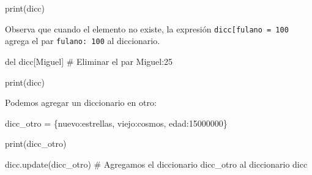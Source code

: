 \documentclass[
  letterpaper,
  DIV=11,
  numbers=noendperiod]{scrreprt}
\newenvironment{Shaded}{\begin{snugshade}}{\end{snugshade}}
\newcommand{\BuiltInTok}[1]{\textcolor[rgb]{0.00,0.23,0.31}{#1}}
\newcommand{\CommentTok}[1]{\textcolor[rgb]{0.37,0.37,0.37}{#1}}
\newcommand{\DecValTok}[1]{\textcolor[rgb]{0.68,0.00,0.00}{#1}}
\newcommand{\KeywordTok}[1]{\textcolor[rgb]{0.00,0.23,0.31}{#1}}
\newcommand{\NormalTok}[1]{\textcolor[rgb]{0.00,0.23,0.31}{#1}}
\newcommand{\OperatorTok}[1]{\textcolor[rgb]{0.37,0.37,0.37}{#1}}
\newcommand{\StringTok}[1]{\textcolor[rgb]{0.13,0.47,0.30}{#1}}
\begin{document}
\begin{Shaded}
\begin{Highlighting}[]
\BuiltInTok{print}\NormalTok{(dicc)}
\end{Highlighting}
\end{Shaded}

Observa que cuando el elemento no existe, la expresión
\texttt{dicc{[}\textquotesingle{}fulano\textquotesingle{}{]}\ =\ 100}
agrega el par \texttt{\textquotesingle{}fulano\textquotesingle{}:\ 100}
al diccionario.

\begin{Shaded}
\begin{Highlighting}[]
\KeywordTok{del}\NormalTok{ dicc[}\StringTok{\textquotesingle{}Miguel\textquotesingle{}}\NormalTok{] }\CommentTok{\# Eliminar el par \textasciigrave{}\textquotesingle{}Miguel\textquotesingle{}:25\textasciigrave{}}
\end{Highlighting}
\end{Shaded}

\begin{Shaded}
\begin{Highlighting}[]
\BuiltInTok{print}\NormalTok{(dicc)}
\end{Highlighting}
\end{Shaded}

Podemos agregar un diccionario en otro:

\begin{Shaded}
\begin{Highlighting}[]
\NormalTok{dicc\_otro }\OperatorTok{=}\NormalTok{ \{}\StringTok{\textquotesingle{}nuevo\textquotesingle{}}\NormalTok{:}\StringTok{\textquotesingle{}estrellas\textquotesingle{}}\NormalTok{, }\StringTok{\textquotesingle{}viejo\textquotesingle{}}\NormalTok{:}\StringTok{\textquotesingle{}cosmos\textquotesingle{}}\NormalTok{, }\StringTok{\textquotesingle{}edad\textquotesingle{}}\NormalTok{:}\DecValTok{15000000}\NormalTok{\}}
\end{Highlighting}
\end{Shaded}

\begin{Shaded}
\begin{Highlighting}[]
\BuiltInTok{print}\NormalTok{(dicc\_otro)}
\end{Highlighting}
\end{Shaded}

\begin{Shaded}
\begin{Highlighting}[]
\NormalTok{dicc.update(dicc\_otro) }\CommentTok{\# Agregamos el diccionario dicc\_otro al diccionario dicc}
\end{Highlighting}
\end{Shaded}
\end{document}
